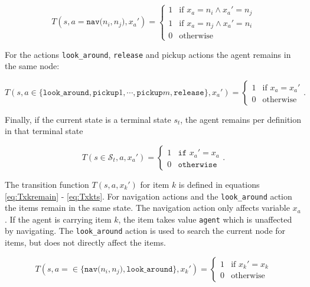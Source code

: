 \begin{equation}\label{eq:Tnavxa}
    T(s, a=\texttt{nav($n_i, n_j$)}, x_a') = \begin{cases}
             1 & \text{if }x_a=n_i \land x_a'=n_j\\
             1 & \text{if }x_a=n_j \land x_a'=n_i\\
             0 & \text{otherwise}
         \end{cases}
\end{equation}

For the actions \texttt{look\_around}, \texttt{release} and pickup actions the agent remains in the same node: 

\begin{equation}
    T(s,a\in\{\texttt{look\_around}, \texttt{pickup}1,\cdots,\texttt{pickup}m, \texttt{release}\}, x_a') = 
    \begin{cases}
        1 & \text{if }x_a=x_a' \\
        0 & \text{otherwise}
    \end{cases}.
\end{equation}

Finally, if the current state is a terminal state $s_t$, the agent remains per definition in that terminal state

\begin{equation}\label{eq:Tstxa}
    T(s\in\mathcal{S}_t, a, x_a') = \begin{cases}1 &\texttt{if }x_a'=x_a\\
         0& \texttt{otherwise}\end{cases}.
\end{equation}

The transition function $T(s, a, x_k')$ for item $k$ is defined in equations \ref{eq:Txkremain} - \ref{eq:Txkts}. For navigation actions and the \texttt{look\_around} action the items remain in the same state. The navigation action only affects variable $x_a$. If the agent is carrying item $k$, the item takes value \texttt{agent} which is unaffected by navigating. The \texttt{look\_around} action is used to search the current node for items, but does not directly affect the items.    

\begin{equation}\label{eq:Txkremain}
    T(s, a=\in\{\texttt{nav($n_i, n_j$)},\texttt{look\_around}\}, x_k') = \begin{cases}
             1 & \text{if }x_k'=x_k\\
             0 & \text{otherwise}
         \end{cases}
\end{equation}

